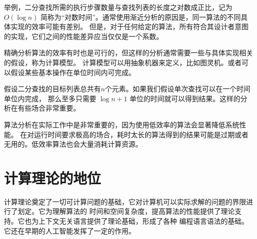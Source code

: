 举例，二分查找所需的执行步骤数量与查找列表的长度之对数成正比，记为 $ O(\log n) $
简称为``对数时间''。通常使用渐近分析的原因是，同一算法的不同具体实现的效率可能有差别。
但是，对于任何给定的算法，所有符合其设计者意图的实现，它们之间的性能差异应当仅仅是一个系数。

精确分析算法的效率有时也是可行的，但这样的分析通常需要一些与具体实现相关的假设，称为计算模型。
计算模型可以用抽象机器来定义，比如图灵机。或者可以假设某些基本操作在单位时间内可完成。

假设二分查找的目标列表总共有$n$个元素。如果我们假设单次查找可以在一个时间单位内完成，
那么至多只需要 $ \log n + 1 $ 单位的时间就可以得到结果。这样的分析在有些场合非常重要。

算法分析在实际工作中是非常重要的，因为使用低效率的算法会显著降低系统性能。
在对运行时间要求极高的场合，耗时太长的算法得到的结果可能是过期或者无用的。低效率算法也会大量消耗计算资源。

\section{计算理论的地位}
计算理论奠定了一切可计算问题的基础，它对计算机可以实际求解的问题的界限进行了划定。它为理解算法的
时间和空间复杂度，提高算法的性能提供了理论支持。它也为上下文无关语言提供了理论基础，形成了各种
编程语言语法的基础。它还在早期的人工智能发挥了一定的作用。
